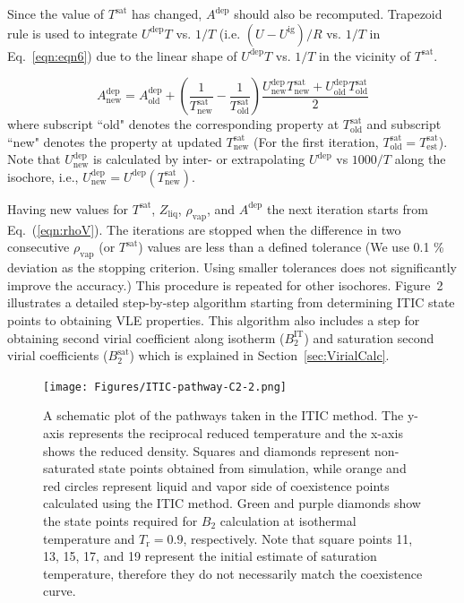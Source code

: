 \documentclass[5p,times]{elsarticle}
\begin{document}
Since the value of $T^\mathrm{sat}$ has changed, $A^\mathrm{dep}$ should also be recomputed. Trapezoid rule is used to integrate $U^\mathrm{dep}T$ vs. $1/T$ (i.e. $(U-U^\mathrm{ig})/R$ vs. $1/T$ in Eq.~\ref{eqn:eqn6}) due to the linear shape of $U^\mathrm{dep}T$ vs. $1/T$ in the vicinity of $T^\mathrm{sat}$.

\begin{equation}
A^\mathrm{dep}_\mathrm{new} = A^\mathrm{dep}_\mathrm{old} + \left( \frac{1}{T^\mathrm{sat}_\mathrm{new}}-\frac{1}{T^\mathrm{sat}_\mathrm{old}} \right) \frac{U^\mathrm{dep}_\mathrm{new}T^\mathrm{sat}_\mathrm{new}+U^\mathrm{dep}_\mathrm{old}T^\mathrm{sat}_\mathrm{old}}{2} 
\label{eqn:aDepCorrection}
\end{equation}
where subscript ``old" denotes the corresponding property at $T^\mathrm{sat}_\mathrm{old}$ and subscript ``new" denotes the property at updated $T^\mathrm{sat}_\mathrm{new}$ (For the first iteration, $T^\mathrm{sat}_\mathrm{old} = T^\mathrm{sat}_\mathrm{est}$). Note that $U^\mathrm{dep}_\mathrm{new}$ is calculated by inter- or extrapolating $U^\mathrm{dep}$ vs $1000/T$ along the isochore, i.e., $U^\mathrm{dep}_\mathrm{new} = U^\mathrm{dep}(T^\mathrm{sat}_\mathrm{new})$.

Having new values for $T^\mathrm{sat}$, $Z_{\mathrm{liq}}$, $\rho_\mathrm{vap}$, and $A^\mathrm{dep}$ the next iteration starts from Eq.~(\ref{eqn:rhoV}). The iterations are stopped when the difference in two consecutive $\rho_\mathrm{vap}$ (or $T^\mathrm{sat}$) values are less than a defined tolerance (We use 0.1 \% deviation as the stopping criterion. Using smaller tolerances does not significantly improve the accuracy.) This procedure is repeated for other isochores. Figure~2 illustrates a detailed step-by-step algorithm starting from determining ITIC state points to obtaining VLE properties. This algorithm also includes a step for obtaining second virial coefficient along isotherm ($B_2^\mathrm{IT}$) and saturation second virial coefficients ($B_2^\mathrm{sat}$) which is explained in Section~\ref{sec:VirialCalc}.
\begin{figure}
\texttt{[image: Figures/ITIC-pathway-C2-2.png]}
\caption{A schematic plot of the pathways taken in the ITIC method. The y-axis represents the reciprocal reduced temperature and the x-axis shows the reduced density. Squares and diamonds represent non-saturated state points obtained from simulation, while orange and red circles represent liquid and vapor side of coexistence points calculated using the ITIC method. Green and purple diamonds show the state points required for $B_2$ calculation at isothermal temperature and $T_\mathrm{r}=0.9$, respectively. Note that square points 11, 13, 15, 17, and 19 represent the initial estimate of saturation temperature, therefore they do not necessarily match the coexistence curve.}
\label{fig:ITICpathway}
\end{figure}
\end{document}
